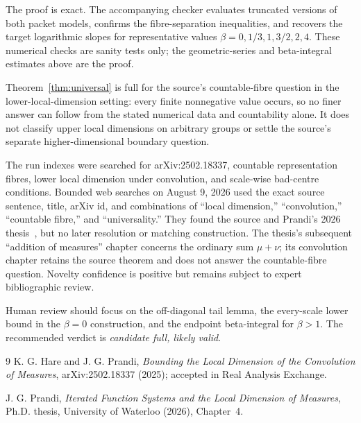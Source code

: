 \documentclass[11pt]{article}
\begin{document}
The proof is exact.  The accompanying checker evaluates truncated versions
of both packet models, confirms the fibre-separation inequalities, and
recovers the target logarithmic slopes for representative values
$\beta=0,1/3,1,3/2,2,4$.  These numerical checks are sanity tests only; the
geometric-series and beta-integral estimates above are the proof.

Theorem~\ref{thm:universal} is full for the source's countable-fibre question
in the lower-local-dimension setting: every finite nonnegative value occurs,
so no finer answer can follow from the stated numerical data and countability
alone.  It does not classify upper local dimensions on arbitrary groups or
settle the source's separate higher-dimensional boundary question.

The run indexes were searched for arXiv:2502.18337, countable representation
fibres, lower local dimension under convolution, and scale-wise bad-centre
conditions.  Bounded web searches on August 9, 2026 used the exact source
sentence, title, arXiv id, and combinations of ``local dimension,''
``convolution,'' ``countable fibre,'' and ``universality.''  They found the
source and Prandi's 2026 thesis~\cite{Prandi}, but no later resolution or
matching construction.  The thesis's subsequent ``addition of measures''
chapter concerns the ordinary sum $\mu+\nu$; its convolution chapter retains
the source theorem and does not answer the countable-fibre question.  Novelty
confidence is positive but remains subject to expert bibliographic review.

Human review should focus on the off-diagonal tail lemma, the every-scale
lower bound in the $\beta=0$ construction, and the endpoint beta-integral for
$\beta>1$.  The recommended verdict is \emph{candidate full, likely valid}.

\begin{thebibliography}{9}
K. G. Hare and J. G. Prandi,
\emph{Bounding the Local Dimension of the Convolution of Measures},
arXiv:2502.18337 (2025); accepted in Real Analysis Exchange.

J. G. Prandi,
\emph{Iterated Function Systems and the Local Dimension of Measures},
Ph.D. thesis, University of Waterloo (2026), Chapter~4.
\end{thebibliography}
\end{document}

